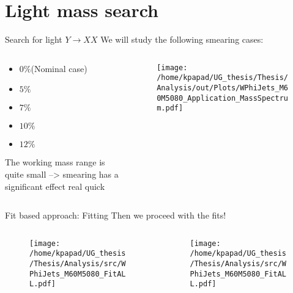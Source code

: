 \documentclass[bigger]{beamer}
\begin{document}
\section{Light mass search}
\label{sec:org569fb27}
\begin{frame}[label={sec:org268c4dc}]{Search for light \(Y \rightarrow XX\)}
We will study the following smearing cases:
\begin{columns}
\begin{column}{0.5\columnwidth}
\begin{itemize}
\item \(0\%\)(Nominal case)
\item \(5\%\)
\item \(7\%\)
\item \(10\%\)
\item \(12\%\)
\end{itemize}
The working mass range is quite small --> smearing has a significant effect real quick 
\end{column}
\begin{column}{0.5\columnwidth}
\begin{figure}[h]
\centering
\texttt{[image: /home/kpapad/UG\_thesis/Thesis/Analysis/out/Plots/WPhiJets\_M60M5080\_Application\_MassSpectrum.pdf]}
\end{figure}
\end{column}
\end{columns}
\end{frame}
\begin{frame}[label={sec:orge0473b7}]{Fit based approach: Fitting}
Then we proceed with the fits!
\begin{columns}
\begin{column}{0.5\columnwidth}
\begin{figure}[h]
\centering
\texttt{[image: /home/kpapad/UG\_thesis/Thesis/Analysis/src/WPhiJets\_M60M5080\_FitALL.pdf]}
\end{figure}
\end{column}

\begin{column}{0.5\columnwidth}
\begin{figure}[h]
\centering
\texttt{[image: /home/kpapad/UG\_thesis/Thesis/Analysis/src/WPhiJets\_M60M5080\_FitALL.pdf]}
\end{figure}
\end{column}
\end{columns}
\end{frame}
\end{document}
